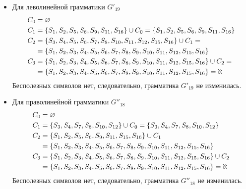 \begin{itemize}
	\item Для леволинейной грамматики \(G'_{19}\)
	      \begin{align*}
		      C_0   & = \varnothing                                                                                            \\
		      C_{1} & = \left\{S_1, S_2, S_5, S_6, S_9, S_{11}, S_{16}\right\} \cup C_0 = \left\{S_1, S_2, S_5, S_6, S_9, S_{11}, S_{16}\right\} \\
		      C_{2} & = \left\{S_3, S_4, S_5, S_6, S_7, S_8, S_{10}, S_{11}, S_{12}, S_{15}, S_{16}\right\} \cup C_{1} =                \\
		            & = \left\{S_1, S_2, S_3, S_4, S_5, S_6, S_7, S_8, S_9, S_{10}, S_{11}, S_{12}, S_{15}, S_{16}\right\}              \\
		      C_{3} & = \left\{S_1, S_2, S_3, S_4, S_5, S_6, S_7, S_8, S_9, S_{10}, S_{11}, S_{12}, S_{15}, S_{16}\right\} \cup C_{2} = \\
		            & = \left\{S_1, S_2, S_3, S_4, S_5, S_6, S_7, S_8, S_9, S_{10}, S_{11}, S_{12}, S_{15}, S_{16}\right\} = \aleph
	      \end{align*}
	      Бесполезных символов нет, следовательно, грамматика \(G'_{19}\) не изменилась.
	\item Для праволинейной грамматики \(G''_{18}\)
	      \begin{align*}
		      C_0   & = \varnothing                                                                                          \\
		      C_{1} & = \left\{S_3, S_4, S_7, S_8, S_{10}, S_{12}\right\} \cup C_0 = \left\{S_3, S_4, S_7, S_8, S_{10}, S_{12}\right\}         \\
		      C_{2} & = \left\{S_1, S_2, S_5, S_6, S_9, S_{11}, S_{15}, S_{16}\right\} \cup C_{1}                                     \\
		            & = \left\{S_1, S_2, S_3, S_4, S_5, S_6, S_7, S_8, S_9, S_{10}, S_{11}, S_{12}, S_{15}, S_{16}\right\}            \\
		      C_{3} & = \left\{S_1, S_2, S_3, S_4, S_5, S_6, S_7, S_8, S_9, S_{10}, S_{11}, S_{12}, S_{15}, S_{16}\right\} \cup C_{2} \\
		            & = \left\{S_1, S_2, S_3, S_4, S_5, S_6, S_7, S_8, S_9, S_{10}, S_{11}, S_{12}, S_{15}, S_{16}\right\} = \aleph
	      \end{align*}
	      Бесполезных символов нет, следовательно, грамматика \(G''_{18}\) не изменилась.
\end{itemize}
